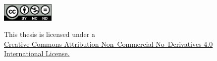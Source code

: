 \documentclass{dstu3008/dstu3008}
\title{\thesisTitle}
\author{\thesisAuthor}
\newcommand{\osh}{}
\newcommand{\osh}{}
\begin{document}

\setcounter{page}{4}

\newpage
\begin{center}
\leavevmode
\includegraphics[width=1in]{images/cc-by-nc-nd.png}
\label{fig:cc}
\end{center}
\begin{center}
This thesis is licensed under a \\
\href{http://creativecommons.org/licenses/by-nc-nd/3.0/}
{Creative Commons Attribution-Non~Commercial-No~Derivatives 4.0 International License.}
\end{center}
\newpage



\tableofcontents





\osh




\end{document}
